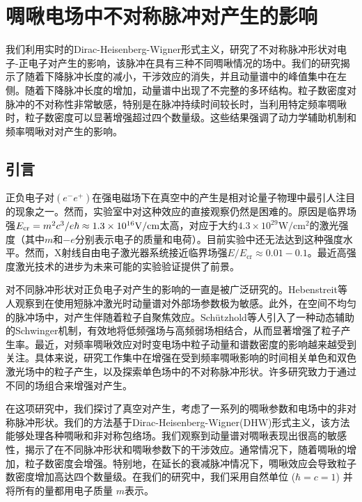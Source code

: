 
\chapter{啁啾电场中不对称脉冲对产生的影响}
我们利用实时的Dirac-Heisenberg-Wigner形式主义，研究了不对称脉冲形状对电子-正电子对产生的影响，该脉冲在具有三种不同啁啾情况的场中。我们的研究揭示了随着下降脉冲长度的减小，干涉效应的消失，并且动量谱中的峰值集中在左侧。随着下降脉冲长度的增加，动量谱中出现了不完整的多环结构。粒子数密度对脉冲的不对称性非常敏感，特别是在脉冲持续时间较长时，当利用特定频率啁啾时，粒子数密度可以显著增强超过四个数量级。这些结果强调了动力学辅助机制和频率啁啾对对产生的影响。

\section{引言}

 正负电子对$(e^{-}e^{+})$在强电磁场下在真空中的产生是相对论量子物理中最引人注目的现象之一\cite{1928s,1931s,1933s,1936s,1951s,2017xie}。然而，实验室中对这种效应的直接观察仍然是困难的。原因是临界场强$E_{\mathrm{cr}}=m^2c^{3} / e \hbar \approx 1.3 \times 10^{16}\rm {\mathrm{V}/\mathrm{cm}}$太高，对应于大约$4.3\times10^{29}\mathrm{W/cm^{2}}$的激光强度（其中$m$和$-e$分别表示电子的质量和电荷）。目前实验中还无法达到这种强度水平。然而，X射线自由电子激光器系统接近临界场强$E/E_{\mathrm{cr}}\approx 0.01-0.1$\cite{2001x}。最近高强度激光技术的进步\cite{2009jiguang,2014jiguang}为未来可能的实验验证提供了前景。

 对不同脉冲形状对正负电子对产生的影响的一直是被广泛研究的。Hebenstreit等人观察到在使用短脉冲激光时动量谱对外部场参数极为敏感\cite{2009h}。此外，在空间不均匀的脉冲场中，对产生伴随着粒子自聚焦效应\cite{2011h}。Schützhold等人引入了一种动态辅助的Schwinger机制\cite{2008d}，有效地将低频强场与高频弱场相结合，从而显著增强了粒子产生率。最近，对频率啁啾效应对时变电场中粒子动量和谱数密度的影响\cite{2010c,2019c,2022x,2023cw}越来越受到关注。具体来说，研究工作集中在增强在受到频率啁啾影响的时间相关单色和双色激光场中的粒子产生\cite{2017c,2020cm,2021cw,2020cg,2021cMM,2021cL}，以及探索单色场中的不对称脉冲形状\cite{2014as,2020as}。许多研究致力于通过不同的场组合来增强对产生。
 
 在这项研究中，我们探讨了真空对产生，考虑了一系列的啁啾参数和电场中的非对称脉冲形状。我们的方法基于Dirac-Heisenberg-Wigner(DHW)形式主义，该方法能够处理各种啁啾和非对称包络场。我们观察到动量谱对啁啾表现出很高的敏感性，揭示了在不同脉冲形状和啁啾参数下的干涉效应。通常情况下，随着啁啾的增加，粒子数密度会增强。特别地，在延长的衰减脉冲情况下，啁啾效应会导致粒子数密度增加高达四个数量级。在我们的研究中，我们采用自然单位 ($\hbar = c = 1$) 并将所有的量都用电子质量 $m$表示。
 
